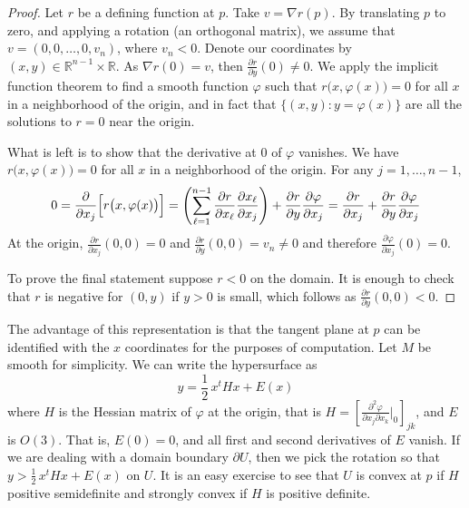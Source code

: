 \documentclass[12pt,openany]{book}
\newcommand{\R}{{\mathbb{R}}}
\theoremstyle{plain}
\theoremstyle{remark}
\theoremstyle{definition}
\theoremstyle{exercise}
\theoremstyle{example}
\begin{document}
\begin{proof}
Let $r$ be a defining function at $p$.  Take $v = \nabla r (p)$.
By translating $p$ to zero, and applying a rotation (an orthogonal matrix),
we assume that $v = (0,0,\ldots,0,v_n)$, where $v_n < 0$.  Denote our
coordinates by $(x,y) \in \R^{n-1} \times \R$.  As $\nabla r(0) =
v$, then $\frac{\partial r}{\partial y}(0) \not= 0$.  We apply 
the implicit function theorem to find a
smooth %
function $\varphi$ such that
$r\bigl(x,\varphi(x)\bigr) = 0$ for all $x$ in a neighborhood of the
origin, and in fact that $\{ (x,y) : y=\varphi(x) \}$ are all the
solutions to $r = 0$ near the origin.

What is left is to show that the derivative at 0 of $\varphi$ vanishes.
We have
$r\bigl(x,\varphi(x)\bigr) = 0$ for all $x$ in a neighborhood of the
origin.
For any $j=1,\ldots,n-1$,
\begin{equation*}
0 = 
\frac{\partial}{\partial x_j} \Bigl[
r\bigl(x,\varphi(x)\bigr) 
\Bigr]
=
\left(
\sum_{\ell=1}^{n-1}
\frac{\partial r}{\partial x_\ell}
\frac{\partial x_\ell}{\partial x_j}
\right)
+
\frac{\partial r}{\partial y}
\frac{\partial \varphi}{\partial x_j}
=
\frac{\partial r}{\partial x_j}
+
\frac{\partial r}{\partial y}
\frac{\partial \varphi}{\partial x_j}
\end{equation*}
At the origin,
$\frac{\partial r}{\partial x_j}(0,0) = 0$ and
$\frac{\partial r}{\partial y}(0,0) = v_n \not= 0$ and therefore
$\frac{\partial \varphi}{\partial x_j}(0) = 0$.

To prove the final statement suppose
$r < 0$ on the domain.  It is enough to check that $r$ is
negative for $(0,y)$ if $y > 0$ is small, which follows as $\frac{\partial
r}{\partial y}(0,0) < 0$.
\end{proof}

The advantage of this representation is that the tangent plane at $p$
can be identified with the $x$ coordinates for the purposes of computation.
Let $M$ be smooth for simplicity.
We can write the hypersurface as
\begin{equation*}
y = \frac{1}{2}\, x^t H x + E(x)
\end{equation*}
where $H$ is the Hessian matrix of $\varphi$ at the origin, that is $H = \left[
\frac{\partial^2 \varphi}{\partial x_j \partial x_k} \big|_{0} \right]_{jk}$,
and $E$ is $O(3)$.  That is, $E(0) = 0$, and
all first and second derivatives of $E$ vanish.  If we are dealing with a domain boundary
$\partial U$, then
we pick the rotation so that $y > \frac{1}{2}\,x^t H x + E(x)$ on $U$.
It is an easy exercise to see that $U$ is convex at $p$ if
$H$ positive semidefinite and strongly convex if $H$ is positive definite.
\end{document}
